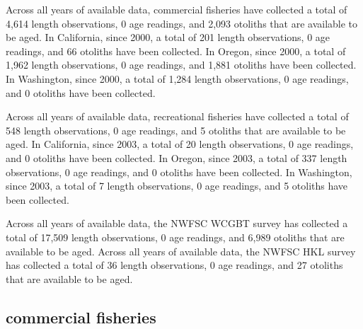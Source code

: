 \documentclass[11pt,
  english,
  letterpaper,
]{article}
\begin{document}

Across all years of available data, commercial fisheries have collected a total of 4,614 length observations, 0 age readings, and 2,093 otoliths that are available to be aged. In California, since 2000, a total of 201 length observations, 0 age readings, and 66 otoliths have been collected. In Oregon, since 2000, a total of 1,962 length observations, 0 age readings, and 1,881 otoliths have been collected. In Washington, since 2000, a total of 1,284 length observations, 0 age readings, and 0 otoliths have been collected.

\leavevmode\tagmcend\tagstructend\par


Across all years of available data, recreational fisheries have collected a total of 548 length observations, 0 age readings, and 5 otoliths that are available to be aged. In California, since 2003, a total of 20 length observations, 0 age readings, and 0 otoliths have been collected. In Oregon, since 2003, a total of 337 length observations, 0 age readings, and 0 otoliths have been collected. In Washington, since 2003, a total of 7 length observations, 0 age readings, and 5 otoliths have been collected.

\leavevmode\tagmcend\tagstructend\par


Across all years of available data, the NWFSC WCGBT survey has collected a total of 17,509 length observations, 0 age readings, and 6,989 otoliths that are available to be aged. Across all years of available data, the NWFSC HKL survey has collected a total of 36 length observations, 0 age readings, and 27 otoliths that are available to be aged.

\leavevmode\tagmcend\tagstructend\par


\hypertarget{commercial-fisheries-41}{%
\subsection{commercial fisheries}\label{commercial-fisheries-41}}

\leavevmode\tagmcend\tagstructend

\end{document}

